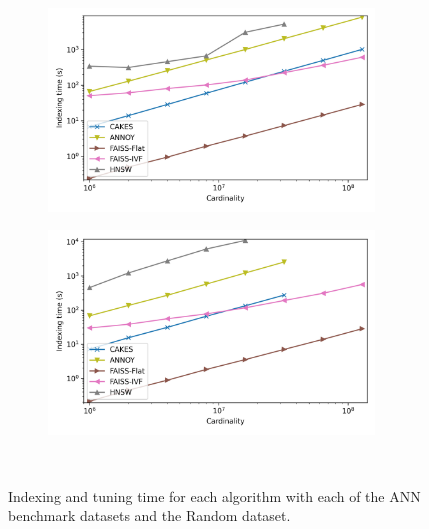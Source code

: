 \documentclass[review,supplement,onefignum,onetabnum]{siamonline220329}
\begin{document}
\begin{figure}
\begin{subfigure}[b]{0.47\textwidth}
        \label{fig:supplement:glove-25-indexing}
    \end{subfigure}
    \vspace{1em}
    \\
    \begin{subfigure}[b]{0.47\textwidth}
        \includegraphics[width=0.95\textwidth]{plots/sift-indexing.png}\\
        \label{fig:supplement:sift-indexing}
    \end{subfigure}%
    \begin{subfigure}[b]{0.47\textwidth}
        \includegraphics[width=0.95\textwidth]{plots/random-indexing.png}\\
        \label{fig:supplement:random-indexing}
    \end{subfigure}%
    \\
    \vspace{1em}
    \caption{Indexing and tuning time for each algorithm with each of the ANN benchmark datasets and the Random dataset.}
    \label{fig:supplement:indexing}
\end{figure}
\end{document}
